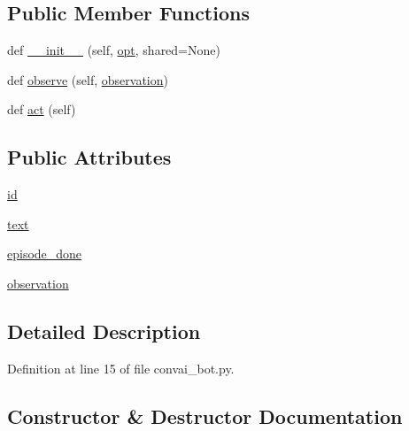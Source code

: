 \subsection*{Public Member Functions}
\begin{DoxyCompactItemize}
\item 
def \hyperlink{classprojects_1_1convai_1_1convai__bot_1_1ConvAISampleAgent_aeda4b425435529ee707d94da833efd2a}{\+\_\+\+\_\+init\+\_\+\+\_\+} (self, \hyperlink{classparlai_1_1core_1_1agents_1_1Agent_ab3b45d2754244608c75d4068b90cd051}{opt}, shared=None)
\item 
def \hyperlink{classprojects_1_1convai_1_1convai__bot_1_1ConvAISampleAgent_ae5914332a263728f39f20dbc3ad749b7}{observe} (self, \hyperlink{classprojects_1_1convai_1_1convai__bot_1_1ConvAISampleAgent_aacf7a75b2dca2c7a1fd71bd59eb238fc}{observation})
\item 
def \hyperlink{classprojects_1_1convai_1_1convai__bot_1_1ConvAISampleAgent_a7eec937e205e191f690adcc742bdb87c}{act} (self)
\end{DoxyCompactItemize}
\subsection*{Public Attributes}
\begin{DoxyCompactItemize}
\item 
\hyperlink{classprojects_1_1convai_1_1convai__bot_1_1ConvAISampleAgent_a0f54fd203c224b271ee65099363ac45d}{id}
\item 
\hyperlink{classprojects_1_1convai_1_1convai__bot_1_1ConvAISampleAgent_ad572c88a70e57a35bbb088c98af7860e}{text}
\item 
\hyperlink{classprojects_1_1convai_1_1convai__bot_1_1ConvAISampleAgent_a8bdf2e2fcc4defb29becfd02e23f058e}{episode\+\_\+done}
\item 
\hyperlink{classprojects_1_1convai_1_1convai__bot_1_1ConvAISampleAgent_aacf7a75b2dca2c7a1fd71bd59eb238fc}{observation}
\end{DoxyCompactItemize}


\subsection{Detailed Description}


Definition at line 15 of file convai\+\_\+bot.\+py.



\subsection{Constructor \& Destructor Documentation}
\mbox{\label{classprojects_1_1convai_1_1convai__bot_1_1ConvAISampleAgent_aeda4b425435529ee707d94da833efd2a}} 
